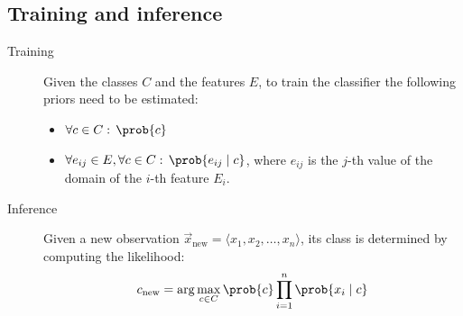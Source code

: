 \subsection{Training and inference}
\begin{description}
    \item[Training]  
        Given the classes $C$ and the features $E$,
        to train the classifier the following priors need to be estimated:
        \begin{itemize}
            \item $\forall c \in C:\, \prob{c}$
            \item $\forall e_{ij} \in E, \forall c \in C:\, \prob{e_{ij} \mid c}$,
                where $e_{ij}$ is the $j$-th value of the domain of the $i$-th feature $E_i$.
        \end{itemize}

    \item[Inference]  
        Given a new observation $\vec{x}_\text{new} = \langle x_1, x_2, \dots, x_n \rangle$,
        its class is determined by computing the likelihood:
        \[
            c_\text{new} = \arg\max_{c \in C} \prob{c} \prod_{i=1}^{n}\prob{x_i \mid c}
        \]
\end{description}


